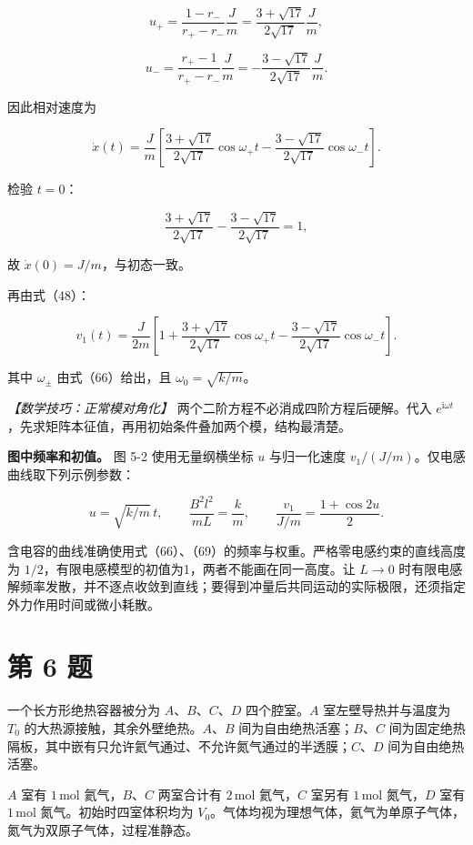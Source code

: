 \documentclass[12pt,a4paper,UTF8]{ctexart}
\begin{document}
\[u_+=\frac{1-r_-}{r_+-r_-}\frac Jm
=\frac{3+\sqrt{17}}{2\sqrt{17}}\frac Jm,\]

\[u_-=\frac{r_+-1}{r_+-r_-}\frac Jm
=-\frac{3-\sqrt{17}}{2\sqrt{17}}\frac Jm. \tag{67c}\]

因此相对速度为

\[\dot x(t)=\frac Jm\left[
\frac{3+\sqrt{17}}{2\sqrt{17}}\cos\omega_+t
-\frac{3-\sqrt{17}}{2\sqrt{17}}\cos\omega_-t
\right]. \tag{68}\]

检验 \(t=0\)：

\[\frac{3+\sqrt{17}}{2\sqrt{17}}
-\frac{3-\sqrt{17}}{2\sqrt{17}}=1,\]

故 \(\dot x(0)=J/m\)，与初态一致。

再由式（48）：

\[\boxed{
v_1(t)=\frac{J}{2m}\left[
1+\frac{3+\sqrt{17}}{2\sqrt{17}}\cos\omega_+t
-\frac{3-\sqrt{17}}{2\sqrt{17}}\cos\omega_-t
\right]
}. \tag{69}\]

其中 \(\omega_\pm\) 由式（66）给出，且 \(\omega_0=\sqrt{k/m}\)。

\emph{【数学技巧：正常模对角化】}
两个二阶方程不必消成四阶方程后硬解。代入
\(e^{\mathrm i\omega t}\)，先求矩阵本征值，再用初始条件叠加两个模，结构最清楚。

\textbf{图中频率和初值。} 图 5-2 使用无量纲横坐标 \(u\) 与归一化速度
\(v_1/(J/m)\)。仅电感曲线取下列示例参数：

\[u=\sqrt{k/m}\,t,\qquad \frac{B^2l^2}{mL}=\frac km,\qquad \frac{v_1}{J/m}=\frac{1+\cos2u}{2}.\]

含电容的曲线准确使用式（66）、（69）的频率与权重。严格零电感约束的直线高度为
\(1/2\)，有限电感模型的初值为1，两者不能画在同一高度。让 \(L\to0\)
时有限电感解频率发散，并不逐点收敛到直线；要得到冲量后共同运动的实际极限，还须指定外力作用时间或微小耗散。

\newpage

\section{第 6 题}\label{ux7b2c-6-ux9898}

一个长方形绝热容器被分为 \(A\)、\(B\)、\(C\)、\(D\) 四个腔室。\(A\)
室左壁导热并与温度为 \(T_0\) 的大热源接触，其余外壁绝热。\(A\)、\(B\)
间为自由绝热活塞；\(B\)、\(C\)
间为固定绝热隔板，其中嵌有只允许氦气通过、不允许氮气通过的半透膜；\(C\)、\(D\)
间为自由绝热活塞。

\(A\) 室有 \(1\,\mathrm{mol}\) 氦气，\(B\)、\(C\) 两室合计有
\(2\,\mathrm{mol}\) 氦气，\(C\) 室另有 \(1\,\mathrm{mol}\) 氮气，\(D\)
室有 \(1\,\mathrm{mol}\) 氮气。初始时四室体积均为
\(V_0\)。气体均视为理想气体，氦气为单原子气体，氮气为双原子气体，过程准静态。
\end{document}
